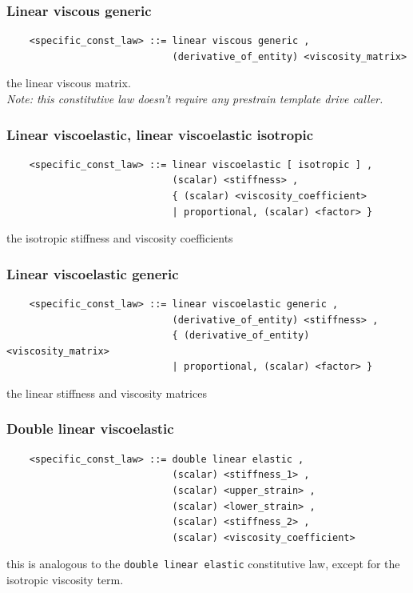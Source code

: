\documentclass[10pt,dvips]{report}
\begin{document}
\subsubsection{Linear viscous generic}
\begin{verbatim}
    <specific_const_law> ::= linear viscous generic , 
                             (derivative_of_entity) <viscosity_matrix>
\end{verbatim}
the linear viscous matrix. \\
{\em 
    Note: this constitutive law doesn't require any prestrain template
    drive caller.
}
  
\subsubsection{Linear viscoelastic, linear viscoelastic isotropic}
\begin{verbatim}
    <specific_const_law> ::= linear viscoelastic [ isotropic ] ,
                             (scalar) <stiffness> ,
                             { (scalar) <viscosity_coefficient>
                             | proportional, (scalar) <factor> }
\end{verbatim}
the isotropic stiffness and viscosity coefficients
  
\subsubsection{Linear viscoelastic generic}
\begin{verbatim}
    <specific_const_law> ::= linear viscoelastic generic ,  
                             (derivative_of_entity) <stiffness> ,
                             { (derivative_of_entity) <viscosity_matrix> 
                             | proportional, (scalar) <factor> }
\end{verbatim}
the linear stiffness and viscosity matrices
  
\subsubsection{Double linear viscoelastic}
\begin{verbatim}
    <specific_const_law> ::= double linear elastic ,
                             (scalar) <stiffness_1> ,
                             (scalar) <upper_strain> ,
                             (scalar) <lower_strain> ,
                             (scalar) <stiffness_2> ,
                             (scalar) <viscosity_coefficient>
\end{verbatim}
this is analogous to the {\tt double linear elastic} constitutive law,
except for the isotropic viscosity term.
  
\end{document}
